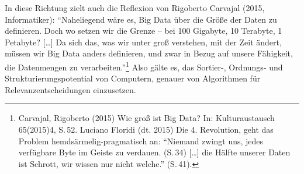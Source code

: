 \documentclass[a4paper,
fontsize=11pt,
oneside,
numbers=noperiodatend,
parskip=half-,
bibliography=totoc,
final
]{scrartcl}
\begin{document}
In diese Richtung zielt auch die Reflexion von Rigoberto Carvajal (2015,
Informatiker): \enquote{Naheliegend wäre es, Big Data über die Größe der
Daten zu definieren. Doch wo setzen wir die Grenze -- bei 100 Gigabyte,
10 Terabyte, 1 Petabyte? {[}\ldots{}{]} Da sich das, was wir unter groß
verstehen, mit der Zeit ändert, müssen wir Big Data anders definieren,
und zwar in Bezug auf unsere Fähigkeit, die Datenmengen zu
verarbeiten.}\footnote{Carvajal, Rigoberto (2015) Wie groß ist Big Data?
  In: Kulturaustausch 65(2015)4, S.\,52. Luciano Floridi (dt. 2015) Die
  4. Revolution, geht das Problem hemdsärmelig-pragmatisch an:
  \enquote{Niemand zwingt uns, jedes verfügbare Byte im Geiste zu
  verdauen. (S.\,34) {[}\ldots{}{]} die Hälfte unserer Daten ist Schrott,
  wir wissen nur nicht welche.} (S.\,41).} Also gälte es, das Sortier-,
Ordnungs- und Strukturierungspotential von Computern, genauer von
Algorithmen für Relevanzentscheidungen einzusetzen.
\end{document}
